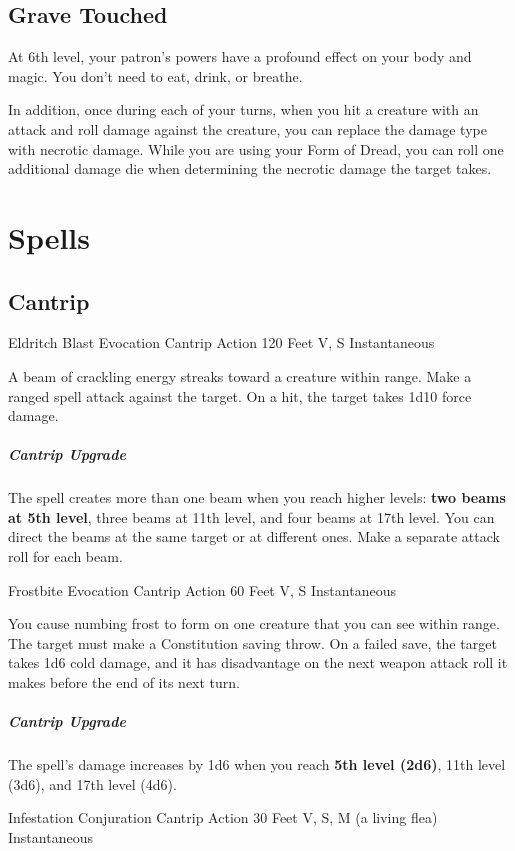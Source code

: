 \documentclass[letterpaper,openany,oneside,twocolumn]{book}
\begin{document}
\subsection{Grave Touched}
At 6th level, your patron's powers have a profound effect on your body and magic. You don't need to eat, drink, or breathe.

In addition, once during each of your turns, when you hit a creature with an attack and roll damage against the creature, you can replace the damage type with necrotic damage. While you are using your Form of Dread, you can roll one additional damage die when determining the necrotic damage the target takes.

\section*{Spells}
\subsection*{Cantrip}

\DndSpellHeader
  {Eldritch Blast}
  {Evocation Cantrip}
  {Action}
  {120 Feet}
  {V, S}
  {Instantaneous}

A beam of crackling energy streaks toward a creature within range. Make a ranged spell attack against the target. On a hit, the target takes 1d10 force damage.

\subparagraph*{Cantrip Upgrade} The spell creates more than one beam when you reach higher levels: \textbf{two beams at 5th level}, three beams at 11th level, and four beams at 17th level. You can direct the beams at the same target or at different ones. Make a separate attack roll for each beam.

\DndSpellHeader
  {Frostbite}
  {Evocation Cantrip}
  {Action}
  {60 Feet}
  {V, S}
  {Instantaneous}

You cause numbing frost to form on one creature that you can see within range. The target must make a Constitution saving throw. On a failed save, the target takes 1d6 cold damage, and it has disadvantage on the next weapon attack roll it makes before the end of its next turn.

\subparagraph*{Cantrip Upgrade} The spell's damage increases by 1d6 when you reach \textbf{5th level (2d6)}, 11th level (3d6), and 17th level (4d6).

\DndSpellHeader
  {Infestation}
  {Conjuration Cantrip}
  {Action}
  {30 Feet}
  {V, S, M (a living flea)}
  {Instantaneous}
\end{document}
